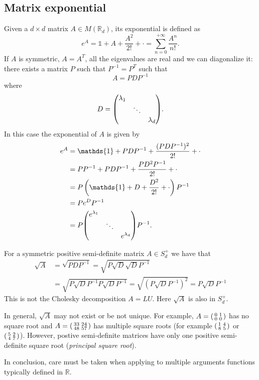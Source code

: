 \subsection{Matrix exponential}
Given a $d\times d$ matrix $A\in M(\mathbb{R}_d)$, its exponential is defined as
\begin{equation*}
    e^A = \mathds{1} + A + \frac{A^2}{2!} + \cdot = \sum_{n=0}^{+\infty} \frac{A^n}{n!}.
\end{equation*}
If $A$ is symmetric, $A = A^T$, all the eigenvalues are real and we can diagonalize it: there exists a matrix $P$ such that $P^{-1}=P^T$ such that
\begin{equation*}
    A = PDP^{-1}
\end{equation*}
where
\begin{equation*}
    D = \mqty(\dmat{\lambda_1,\ddots,\lambda_d}).
\end{equation*}
In this case the exponential of $A$ is given by
\begin{align*}
    e^A &= \mathds{1} + PDP^{-1} + \frac{(PDP^{-1})^2}{2!} + \cdot \\
    &=
    PP^{-1} + PDP^{-1} + \frac{PD^2P^{-1}}{2!} + \cdot \\
    &=
    P\left(\mathds{1} + D + \frac{D^2}{2!} + \cdot\right)P^{-1} \\
    &=
    Pe^DP^{-1} \\
    &=
    P\mqty(\dmat{e^{\lambda_1},\ddots,e^{\lambda_d}})P^{-1}.
\end{align*}
\begin{remark}
    For a symmetric positive semi-definite matrix $A\in S^+_d$ we have that
    \begin{align*}
        \sqrt{A} &= \sqrt{PDP^{-1}} = \sqrt{P\sqrt{D}\sqrt{D}P^{-1}} \\
        &=
        \sqrt{P\sqrt{D}P^{-1}P\sqrt{D}P^{-1}} = \sqrt{(P\sqrt{D}P^{-1})^2} = P\sqrt{D}P^{-1}
    \end{align*}
    This is not the Cholesky decomposition $A=LU$. Here $\sqrt{A}$ is also in $S^+_d$.
\end{remark}
\begin{remark}
    In general, $\sqrt{A}$ may not exist or be not unique. For example, $A=\smqty(0 & 1 \\ 0 & 0)$ has no square root and $A = \smqty(33 & 24 \\ 48 & 57)$ has multiple square roots (for example $\smqty(1 & 4 \\ 8 & 5)$ or $\smqty(5 & 2 \\ 4 & 7)$). However, postive semi-definite matrices have only one positive semi-definite square root (\emph{principal square root}).
\end{remark}
In conclusion, care must be taken when applying to multiple arguments functions typically defined in $\mathbb{R}$.

